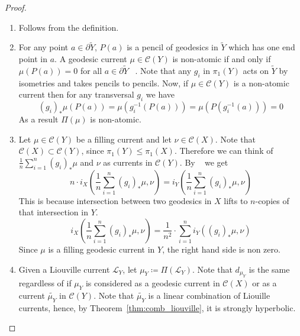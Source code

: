\documentclass[12pt]{amsart}
\numberwithin{equation}{section}
\numberwithin{figure}{section}
\theoremstyle{definition}
\theoremstyle{plain}
\newcommand\C{\mathcal{C}}
\newcommand*{\wt}[1]{\widetilde{#1}}
\begin{document}
\begin{proof}
\begin{enumerate}

\item Follows from the definition.\\

\item For any point $a \in \partial \wt{Y}$, $P(a)$ is a pencil of geodesics in $\wt{Y}$  which has one end point in $a$. A geodesic current $\mu \in \C(Y)$ is non-atomic if and only if $\mu(P(a)) = 0$ for all $a \in \partial \wt{Y}$ ~\cite[Proposition 8.2.8]{Martelli16:IntroGeoTop}. Note that any $g_{i}$ in $\pi_{1}(Y)$ acts on $\wt{Y}$ by isometries and takes pencils to pencils. Now, if $\mu \in \C(Y)$ is a non-atomic current then for any transversal $g_{i}$ we have 
\[
(g_i)_*\mu(P(a))=\mu(g_i^{-1}(P(a))) = \mu(P(g_i^{-1}(a)))= 0
\]
As a result $\Pi(\mu)$ is non-atomic.\\


\item Let $\mu \in \mathcal{C}(Y)$ be a filling current and let $\nu \in \mathcal{C}(X)$. Note that $\mathcal{C}(X) \subset \mathcal{C}(Y)$, since $\pi_1(Y) \leq \pi_1(X)$. Therefore we can think of $\frac{1}{n} \sum_{i=1}^n (g_i)_* \mu$ and $\nu$ as currents in $\mathcal{C}(Y)$. By ~\cite[Lemma~2.22]{Hv24:Commensurating} we get 
\[
    n \cdot i_X\left(\frac{1}{n} \sum_{i=1}^n (g_i)_* \mu, \nu\right) =  i_Y\left(\frac{1}{n} \sum_{i=1}^n {(g_i)_* \mu}, {\nu}\right)
\]
This is because intersection between two geodesics in $X$ lifts to $n$-copies of that intersection in $Y$.
\[
    i_X\left(\frac{1}{n} \sum_{i=1}^n (g_i)_* \mu, \nu\right) = \frac{1}{n^2} \cdot \sum_{i=1}^n  i_Y( {(g_i)_* \mu}, \nu)
\]
 Since $\mu$ is a filling geodesic current in $Y$, the right hand side is non zero.\\












\item Given a Liouville current $\mathcal{L}_Y$, let $\mu_Y \coloneqq \Pi(\mathcal{L}_Y)$.
Note that $d_{\mu_Y}$ is the same regardless of if $\mu_Y$ is considered as a geodesic current in $\C(X)$ or as a current $\wt{\mu_Y}$ in $\C(Y)$.
Note that $\wt{\mu_Y}$ is a linear
combination of Liouille currents, hence, by Theorem~\ref{thm:comb_liouville}, it is strongly hyperbolic.


\end{enumerate}
\end{proof}
\end{document}
